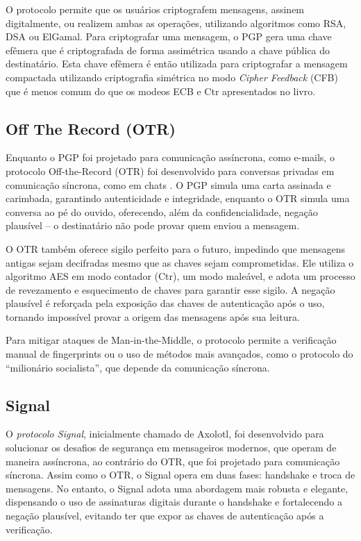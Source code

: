 O protocolo permite que os usuários criptografem mensagens, assinem digitalmente, ou realizem ambas as operações, utilizando algoritmos como RSA, DSA ou ElGamal.
Para criptografar uma mensagem, o PGP gera uma chave efêmera que é criptografada de forma assimétrica usando a chave pública do destinatário.
Esta chave efêmera é então utilizada para criptografar a mensagem compactada utilizando criptografia simétrica no modo {\em Cipher Feedback} (CFB) que é menos comum do que os modeos ECB e Ctr apresentados no livro.

\subsection{Off The Record (OTR)}

Enquanto o PGP foi projetado para comunicação assíncrona, como e-mails, o protocolo Off-the-Record (OTR) foi desenvolvido para conversas privadas em comunicação síncrona, como em chats \cite{Borisov04}.
O PGP simula uma carta assinada e carimbada, garantindo autenticidade e integridade, enquanto o OTR simula uma conversa ao pé do ouvido, oferecendo, além da confidencialidade, negação plausível -- o destinatário não pode provar quem enviou a mensagem.

O OTR também oferece sigilo perfeito para o futuro, impedindo que mensagens antigas sejam decifradas mesmo que as chaves sejam comprometidas.
Ele utiliza o algoritmo AES em modo contador (Ctr), um modo maleável, e adota um processo de revezamento e esquecimento de chaves para garantir esse sigilo.
A negação plausível é reforçada pela exposição das chaves de autenticação após o uso, tornando impossível provar a origem das mensagens após sua leitura.

Para mitigar ataques de Man-in-the-Middle, o protocolo permite a verificação manual de fingerprints ou o uso de métodos mais avançados, como o protocolo do ``milionário socialista'', que depende da comunicação síncrona.

\subsection{Signal}

O \textit{protocolo Signal}, inicialmente chamado de Axolotl, foi desenvolvido para solucionar os desafios de segurança em mensageiros modernos, que operam de maneira assíncrona, ao contrário do OTR, que foi projetado para comunicação síncrona.
Assim como o OTR, o Signal opera em duas fases: handshake e troca de mensagens.
No entanto, o Signal adota uma abordagem mais robusta e elegante, dispensando o uso de assinaturas digitais durante o handshake e fortalecendo a negação plausível, evitando ter que expor as chaves de autenticação após a verificação.

